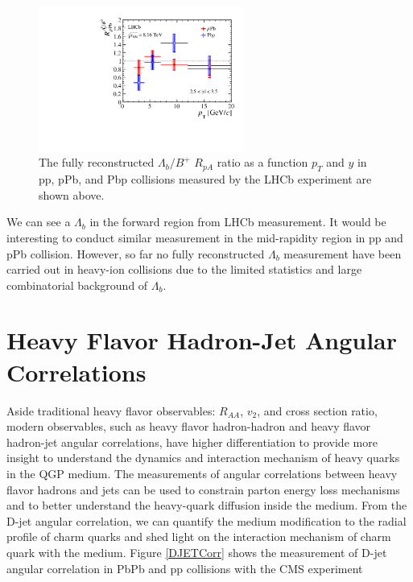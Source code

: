 \begin{figure}[hbtp]
\begin{center}
\includegraphics[width=0.60\textwidth]{Figures/Chapter2/LHCbRpPb.png}
\caption{The fully reconstructed $\Lambda_b/B^+$ $R_{pA}$ ratio as a function $p_T$ and $y$ in pp, pPb, and Pbp collisions measured by the LHCb experiment are shown above.}
\label{LHCbLambda}
\end{center}
\end{figure}   


We can see a  $\Lambda_b$ in the forward region from LHCb measurement. It would be interesting to conduct similar measurement in the mid-rapidity region in pp and pPb collision. However, so far no fully reconstructed $\Lambda_b$ measurement have been carried out in heavy-ion collisions due to the limited statistics and large combinatorial background of $\Lambda_b$. 

\section{Heavy Flavor Hadron-Jet Angular Correlations}

Aside traditional heavy flavor observables: $R_{AA}$, $v_{2}$, and cross section ratio, modern observables, such as heavy flavor hadron-hadron and heavy flavor hadron-jet angular correlations, have higher differentiation to provide more insight to understand the dynamics and interaction mechanism of heavy quarks in the QGP medium. The measurements of angular correlations between heavy flavor hadrons and jets can be used to constrain parton energy loss mechanisms and to better understand the heavy-quark diffusion inside the medium. From the D-jet angular correlation, we can quantify the medium modification to the radial profile of charm quarks and shed light on the interaction mechanism of charm quark with the medium. Figure \ref{DJETCorr} shows the measurement of D-jet angular correlation in PbPb and pp collisions with the CMS experiment \cite{CMSDJet}

